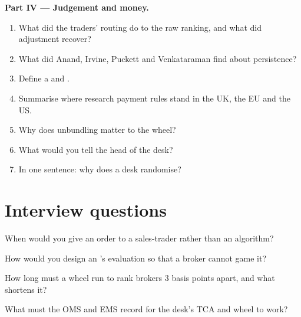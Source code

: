 \begin{problem}
\medskip\noindent\textbf{Part IV --- Judgement and money.}
\begin{enumerate}[resume]
\item What did the traders' routing do to the raw ranking, and what did adjustment recover?
\item What did Anand, Irvine, Puckett and Venkataraman find about persistence?
\item Define a  and .
\item Summarise where research payment rules stand in the UK, the EU and the US.
\item Why does unbundling matter to the wheel?
\item What would you tell the head of the desk?
\item In one sentence: why does a desk randomise?
\end{enumerate}
\end{problem}

\section{Interview questions}

\begin{interviewq}\label{iq:mx:the-buy-side-trading-desk-and-its-brokers:1}
When would you give an order to a sales-trader rather than an algorithm?
\end{interviewq}

\begin{interviewq}\label{iq:mx:the-buy-side-trading-desk-and-its-brokers:2}
How would you design an 's evaluation so that a broker cannot game it?
\end{interviewq}

\begin{interviewq}\label{iq:mx:the-buy-side-trading-desk-and-its-brokers:3}
How long must a wheel run to rank brokers 3 basis points apart, and what shortens it?
\end{interviewq}

\begin{interviewq}\label{iq:mx:the-buy-side-trading-desk-and-its-brokers:4}
What must the OMS and EMS record for the desk's TCA and wheel to work?
\end{interviewq}

